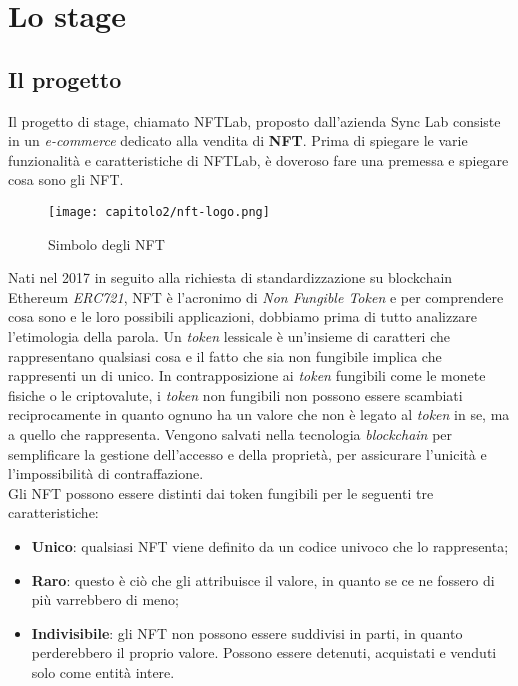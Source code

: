 
\chapter{Lo stage}
\label{cap:stage}


\section{Il progetto}
Il progetto di stage, chiamato NFTLab, proposto dall'azienda Sync Lab consiste in un \emph{e-commerce} dedicato alla vendita di \textbf{NFT}. Prima di spiegare le varie funzionalità e caratteristiche di NFTLab, è doveroso fare una premessa e spiegare cosa sono gli NFT. \\

\begin{figure}[!h]
  \centering
  \texttt{[image: capitolo2/nft-logo.png]}
  \caption{Simbolo degli NFT}
\end{figure}

Nati nel 2017 in seguito alla richiesta di standardizzazione su blockchain Ethereum \emph{ERC721}, NFT è l'acronimo di \emph{Non Fungible Token} e per comprendere cosa sono e le loro possibili applicazioni, dobbiamo prima di tutto analizzare l'etimologia della parola. 
Un \emph{token} lessicale è un'insieme di caratteri che rappresentano qualsiasi cosa e il fatto che sia non fungibile implica che rappresenti un  di unico. 
In contrapposizione ai \emph{token} fungibili come le monete fisiche o le \gls{criptovalute}, i \emph{token} non fungibili non possono essere scambiati reciprocamente in quanto ognuno ha un valore che non è legato al \emph{token} in se, ma a quello che rappresenta.
Vengono salvati nella tecnologia \emph{blockchain} per semplificare la gestione dell'accesso e della proprietà, per assicurare l'unicità e l'impossibilità di contraffazione. \\

\noindent Gli NFT possono essere distinti dai token fungibili per le seguenti tre caratteristiche:
\begin{itemize}
  \item \textbf{Unico}: qualsiasi NFT viene definito da un codice univoco che lo rappresenta;
  \item \textbf{Raro}: questo è ciò che gli attribuisce il valore, in quanto se ce ne fossero di più varrebbero di meno;
  \item \textbf{Indivisibile}: gli NFT non possono essere suddivisi in parti, in quanto perderebbero il proprio valore. Possono essere detenuti, acquistati e venduti solo come entità intere.
\end{itemize}

